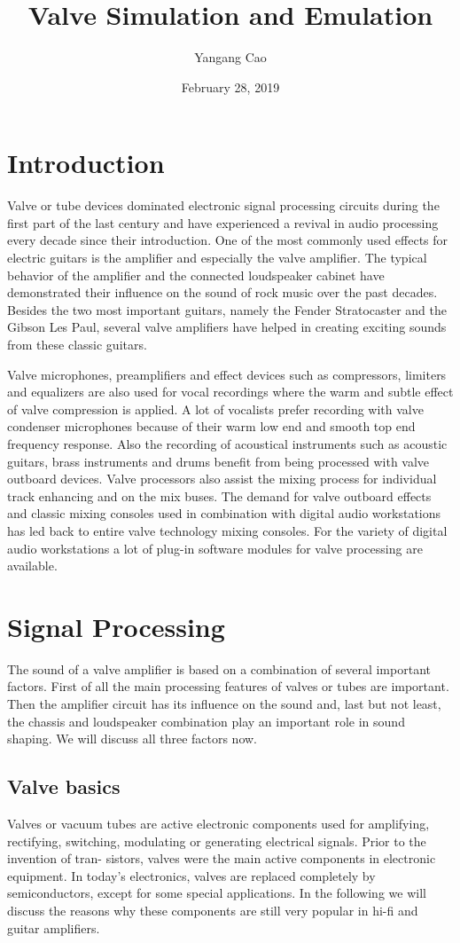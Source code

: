 \documentclass[10pt,a4paper,oneside]{article}
\author{Yangang Cao}
\date{February 28, 2019}
\begin{document}
\title{Valve Simulation and Emulation}
\maketitle 
\section{Introduction}
Valve or tube devices dominated electronic signal processing circuits during the first part of the last century and have experienced a revival in audio processing every decade since their introduction. One of the most commonly used effects for electric guitars is the amplifier and especially the valve amplifier. The typical behavior of the amplifier and the connected loudspeaker cabinet have demonstrated their influence on the sound of rock music over the past decades. Besides the two most important guitars, namely the Fender Stratocaster and the Gibson Les Paul, several valve amplifiers have helped in creating exciting sounds from these classic guitars.

Valve microphones, preamplifiers and effect devices such as compressors, limiters and equalizers are also used for vocal recordings where the warm and subtle effect of valve compression is applied. A lot of vocalists prefer recording with valve condenser microphones because of their warm low end and smooth top end frequency response. Also the recording of acoustical instruments such as acoustic guitars, brass instruments and drums benefit from being processed with valve outboard devices. Valve processors also assist the mixing process for individual track enhancing and on the mix buses. The demand for valve outboard effects and classic mixing consoles used in combination with digital audio workstations has led back to entire valve technology mixing consoles. For the variety of digital audio workstations a lot of plug-in software modules for valve processing are available.
\section{Signal Processing}
The sound of a valve amplifier is based on a combination of several important factors. First of all the main processing features of valves or tubes are important. Then the amplifier circuit has its influence on the sound and, last but not least, the chassis and loudspeaker combination play an important role in sound shaping. We will discuss all three factors now.

\subsection{Valve basics}
	Valves or vacuum tubes are active electronic components used for amplifying, rectifying, switching, modulating or generating electrical signals. Prior to the invention of tran- sistors, valves were the main active components in electronic equipment. In today’s electronics, valves are replaced completely by semiconductors, except for some special applications. In the following we will discuss the reasons why these components are still very popular in hi-fi and guitar amplifiers.
\end{document}
